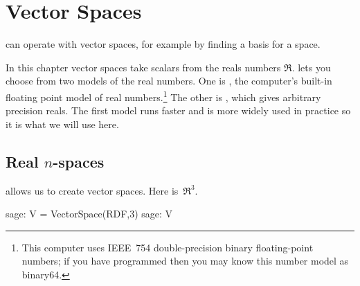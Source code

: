 \chapter{Vector Spaces}

\Sage{} can operate with vector spaces, for example by finding a basis for
a space.

In this chapter vector spaces take scalars from the reals numbers $\Re$.
\Sage{} lets you choose from two models of the real numbers.
One is , the computer's built-in floating point
model of real numbers.\footnote{%
  This computer uses
  IEEE~754 double-precision binary floating-point numbers;  
  if you have programmed then you may know this number model as binary64.}  
The other is , which gives arbitrary precision 
reals.
The first model runs faster
and is more widely used in practice so it is what we will use here.
 




\section{Real $n$-spaces}

\Sage{} allows us to create vector spaces.
Here is~$\Re^3$.
\begin{sagecommandline}
sage: V = VectorSpace(RDF,3)
sage: V
\end{sagecommandline}

